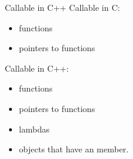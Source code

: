 \begin{frame}{Callable in C++}
    Callable in C:
    \begin{itemize}
        \item functions
        \item pointers to functions
    \end{itemize}
    \pause
    Callable in C++:
    \begin{itemize}
        \item functions
        \item pointers to functions
        \item lambdas
        \item objects that have an  member.
    \end{itemize}
\end{frame}